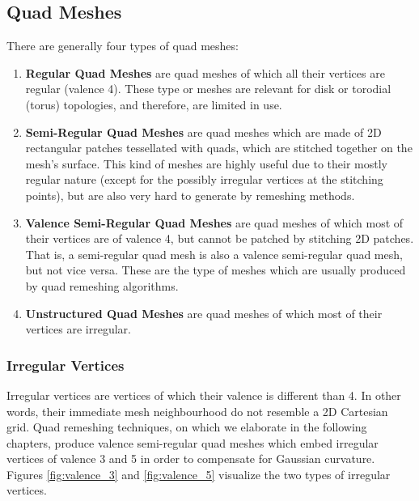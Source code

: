 \subsection{Quad Meshes}
There are generally four types of quad meshes:

\begin{enumerate}
\item \textbf{Regular Quad Meshes} are quad meshes of which all their vertices are regular (valence 4). These type or meshes are relevant for disk or torodial (torus) topologies, and therefore, are limited in use.
\item \textbf{Semi-Regular Quad Meshes} are quad meshes which are made of 2D rectangular patches tessellated with quads, which are stitched together on the mesh's surface. This kind of meshes are highly useful due to their mostly regular nature (except for the possibly irregular vertices at the stitching points), but are also very hard to generate by remeshing methods.
\item \textbf{Valence Semi-Regular Quad Meshes} are quad meshes of which most of their vertices are of valence 4, but cannot be patched by stitching 2D patches. That is, a semi-regular quad mesh is also a valence semi-regular quad mesh, but not vice versa. These are the type of meshes which are usually produced by quad remeshing algorithms.
\item \textbf{Unstructured Quad Meshes} are quad meshes of which most of their vertices are irregular.
\end{enumerate}

\subsubsection{Irregular Vertices}
Irregular vertices are vertices of which their valence is different than 4. In other words, their immediate mesh neighbourhood do not resemble a 2D Cartesian grid. Quad remeshing techniques, on which we elaborate in the following chapters, produce valence semi-regular quad meshes which embed irregular vertices of valence 3 and 5 in order to compensate for Gaussian curvature. Figures \ref{fig:valence_3} and \ref{fig:valence_5} visualize the two types of irregular vertices.

